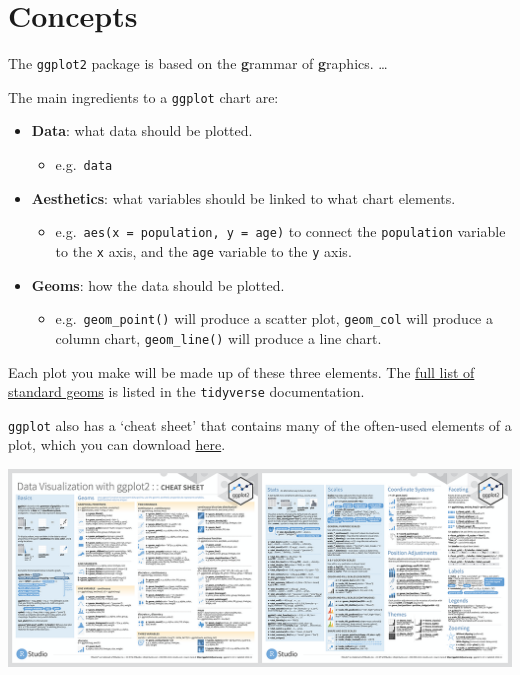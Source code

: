 \documentclass[]{book}
\providecommand{\tightlist}{%
  \setlength{\itemsep}{0pt}\setlength{\parskip}{0pt}}
\begin{document}
\hypertarget{concepts}{%
\section{Concepts}\label{concepts}}

The \texttt{ggplot2} package is based on the \textbf{g}rammar of \textbf{g}raphics. \ldots{}

The main ingredients to a \texttt{ggplot} chart are:

\begin{itemize}
\tightlist
\item
  \textbf{Data}: what data should be plotted.

  \begin{itemize}
  \tightlist
  \item
    e.g.~\texttt{data}
  \end{itemize}
\item
  \textbf{Aesthetics}: what variables should be linked to what chart elements.

  \begin{itemize}
  \tightlist
  \item
    e.g.~\texttt{aes(x\ =\ population,\ y\ =\ age)} to connect the \texttt{population} variable to the \texttt{x} axis, and the \texttt{age} variable to the \texttt{y} axis.
  \end{itemize}
\item
  \textbf{Geoms}: how the data should be plotted.

  \begin{itemize}
  \tightlist
  \item
    e.g.~\texttt{geom\_point()} will produce a scatter plot, \texttt{geom\_col} will produce a column chart, \texttt{geom\_line()} will produce a line chart.
  \end{itemize}
\end{itemize}

Each plot you make will be made up of these three elements. The \href{https://ggplot2.tidyverse.org/reference/}{full list of standard geoms} is listed in the \texttt{tidyverse} documentation.

\texttt{ggplot} also has a `cheat sheet' that contains many of the often-used elements of a plot, which you can download \href{https://github.com/rstudio/cheatsheets/raw/master/data-visualization-2.1.pdf}{here}.

\begin{center}\includegraphics[width=17.08in]{atlas/ggplot_cheat_sheet} \end{center}
\end{document}
